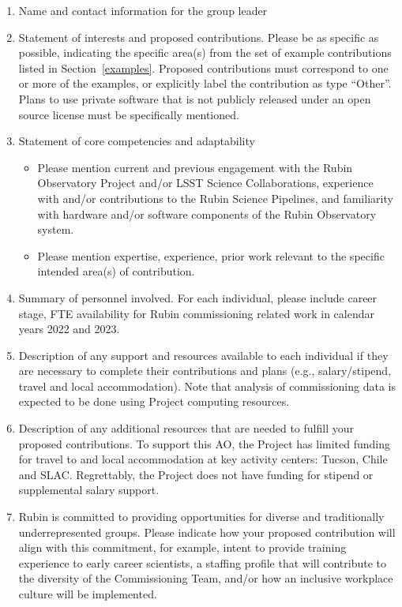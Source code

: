 \documentclass[SE,authoryear,toc,lsstdraft]{lsstdoc}
\begin{document}
\begin{enumerate}
\item Name and contact information for the group leader

\item Statement of interests and proposed contributions. Please be as specific as possible, indicating the specific area(s) from the set of example contributions listed in Section~\ref{examples}. Proposed contributions must correspond to one or more of the examples, or explicitly label the contribution as type ``Other''. Plans to use private software that is not publicly released under an open source license must be specifically mentioned.

\item Statement of core competencies and adaptability
\begin{itemize}
\item Please mention current and previous engagement with the Rubin Observatory Project and/or LSST Science Collaborations, experience with and/or contributions to the Rubin Science Pipelines, and familiarity with hardware and/or software components of the Rubin Observatory system.
\item Please mention expertise, experience, prior work relevant to the specific intended area(s) of contribution.
\end{itemize}

\item Summary of personnel involved. For each individual, please include career stage, FTE availability for Rubin commissioning related work in calendar years 2022 and 2023. 

\item Description of any support and resources available to each individual if they are necessary to complete their contributions and plans (e.g., salary/stipend, travel and local accommodation). Note that analysis of commissioning data is expected to be done using Project computing resources.

\item Description of any additional resources that are needed to fulfill your proposed contributions. To support this AO, the Project has limited funding for travel to and local accommodation at key activity centers: Tucson, Chile and SLAC.  Regrettably, the Project does not have funding for stipend or supplemental salary support.

\item Rubin is committed to providing opportunities for diverse and traditionally underrepresented groups. Please indicate how your proposed contribution will align with this commitment, for example, intent to provide training experience to early career scientists, a staffing profile that will contribute to the diversity of the Commissioning Team, and/or how an inclusive workplace culture will be implemented. 
\end{enumerate}
\end{document}
